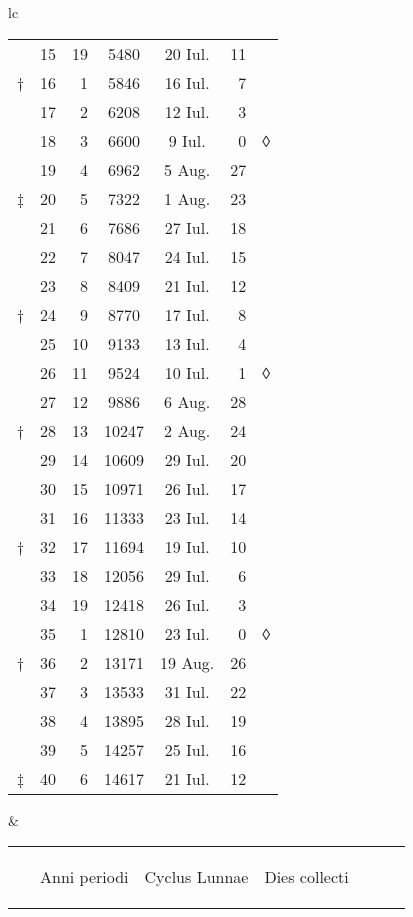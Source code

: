 \begin{tabular}{lc}
\begin{tabular}[t]{r rrccr l}
~ & 15 & 19 & 5480 & 20 Iul. & 11 \\
† & 16 &  1 & 5846 & 16 Iul. &  7 \\
\cline{2-6}
~ & 17 &  2 & 6208 & 12 Iul. &  3 \\
~ & 18 &  3 & 6600 &  9 Iul. &  0 & ◊\\
~ & 19 &  4 & 6962 &  5 Aug. & 27 \\
‡ & 20 &  5 & 7322 &  1 Aug. & 23 \\
\cline{2-6}
~ & 21 &  6 & 7686 & 27 Iul. & 18 \\
~ & 22 &  7 & 8047 & 24 Iul. & 15 \\
~ & 23 &  8 & 8409 & 21 Iul. & 12 \\
† & 24 &  9 & 8770 & 17 Iul. &  8 \\
\cline{2-6}
~ & 25 & 10 &  9133 & 13 Iul. &  4 \\
~ & 26 & 11 &  9524 & 10 Iul. &  1 & ◊ \\
~ & 27 & 12 &  9886 &  6 Aug. & 28 \\
† & 28 & 13 & 10247 &  2 Aug. & 24 \\
\cline{2-6}
~ & 29 & 14 & 10609 & 29 Iul. & 20 \\
~ & 30 & 15 & 10971 & 26 Iul. & 17 \\
~ & 31 & 16 & 11333 & 23 Iul. & 14 \\
† & 32 & 17 & 11694 & 19 Iul. & 10 \\
\cline{2-6}
~ & 33 & 18 & 12056 & 29 Iul. &  6 \\
~ & 34 & 19 & 12418 & 26 Iul. &  3 \\
~ & 35 &  1 & 12810 & 23 Iul. &  0 & ◊ \\
† & 36 &  2 & 13171 & 19 Aug. & 26 \\
\cline{2-6}
~ & 37 &  3 & 13533 & 31 Iul. & 22 \\
~ & 38 &  4 & 13895 & 28 Iul. & 19 \\
~ & 39 &  5 & 14257 & 25 Iul. & 16 \\
‡ & 40 &  6 & 14617 & 21 Iul. & 12 \\
\cline{2-6}
\end{tabular}
&
\begin{tabular}[t]{r rrccr l}
~ &
\begin{rotate}{60}Anni periodi\end{rotate} &
\begin{rotate}{60}Cyclus Lunnae\end{rotate} &
\begin{rotate}{60}Dies collecti\end{rotate} &

\end{tabular}
\end{tabular}

